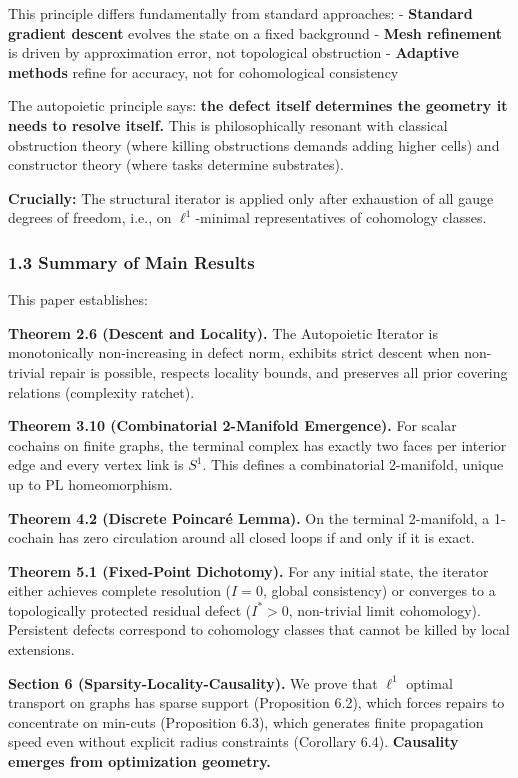 \documentclass[
]{article}
\begin{document}
This principle differs fundamentally from standard approaches: -
\textbf{Standard gradient descent} evolves the state on a fixed
background - \textbf{Mesh refinement} is driven by approximation error,
not topological obstruction - \textbf{Adaptive methods} refine for
accuracy, not for cohomological consistency

The autopoietic principle says: \textbf{the defect itself determines the
geometry it needs to resolve itself.} This is philosophically resonant
with classical obstruction theory (where killing obstructions demands
adding higher cells) and constructor theory (where tasks determine
substrates).

\textbf{Crucially:} The structural iterator is applied only after
exhaustion of all gauge degrees of freedom, i.e., on \(\ell^1\)-minimal
representatives of cohomology classes.

\subsubsection{1.3 Summary of Main
Results}\label{summary-of-main-results}

This paper establishes:

\textbf{Theorem 2.6 (Descent and Locality).} The Autopoietic Iterator is
monotonically non-increasing in defect norm, exhibits strict descent
when non-trivial repair is possible, respects locality bounds, and
preserves all prior covering relations (complexity ratchet).

\textbf{Theorem 3.10 (Combinatorial 2-Manifold Emergence).} For scalar
cochains on finite graphs, the terminal complex has exactly two faces
per interior edge and every vertex link is \(S^1\). This defines a
combinatorial 2-manifold, unique up to PL homeomorphism.

\textbf{Theorem 4.2 (Discrete Poincaré Lemma).} On the terminal
2-manifold, a 1-cochain has zero circulation around all closed loops if
and only if it is exact.

\textbf{Theorem 5.1 (Fixed-Point Dichotomy).} For any initial state, the
iterator either achieves complete resolution (\(I = 0\), global
consistency) or converges to a topologically protected residual defect
(\(I^* > 0\), non-trivial limit cohomology). Persistent defects
correspond to cohomology classes that cannot be killed by local
extensions.

\textbf{Section 6 (Sparsity-Locality-Causality).} We prove that
\(\ell^1\) optimal transport on graphs has sparse support (Proposition
6.2), which forces repairs to concentrate on min-cuts (Proposition 6.3),
which generates finite propagation speed even without explicit radius
constraints (Corollary 6.4). \textbf{Causality emerges from optimization
geometry.}
\end{document}
